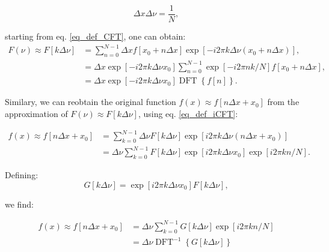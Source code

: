 \begin{equation}
\Delta x \Delta \nu = \frac{1}{N},
\end{equation}


starting from eq. \eqref{eq_def_CFT}, one can obtain:
\begin{equation}\label{eq_approx_CFT}
\begin{aligned}
	F(\nu) \approx F[k\Delta \nu] &= \sum_{n=0}^{N-1} \Delta x f[x_0 +n\Delta x] \operatorname{exp} \left[-i2\pi k \Delta \nu (x_0 +n \Delta x)\right],\\
	&= \Delta x \operatorname{exp}\left[-i 2\pi k \Delta \nu x_0\right] \sum_{n=0}^{N-1} \operatorname{exp}\left[-i2\pi nk/N\right] f[x_0 +n\Delta x], \\
	&= \Delta x \operatorname{exp}\left[-i 2\pi k \Delta \nu x_0\right] \operatorname{DFT}\left\{f[n]\right\}.
\end{aligned}
\end{equation}

Similary, we can reobtain the original function $f(x) \approx f[n\Delta x + x_0]$ from the approximation of $F(\nu) \approx F[k\Delta \nu]$, using eq. \eqref{eq_def_iCFT}:

\begin{equation}
	\begin{aligned}
	f(x) \approx f[n\Delta x+ x_0] &= \sum_{k=0}^{N-1} \Delta \nu F[k\Delta \nu] \operatorname{exp}\left[i2\pi k\Delta \nu (n\Delta x + x_0)\right]\\
	&= \Delta\nu \sum_{k=0}^{N-1}F[k\Delta\nu]\operatorname{exp}\left[i2\pi k\Delta \nu x_0\right]\operatorname{exp}\left[i2\pi kn/N\right].
	\end{aligned}
\end{equation}

Defining:
\begin{equation}
G[k\Delta\nu]  = \operatorname{exp}\left[i2\pi k \Delta\nu x_0\right] F[k\Delta\nu],
\end{equation}

we find:

\begin{equation}
	\begin{aligned}
	f(x) \approx f[n\Delta x+ x_0] &=  \Delta\nu \sum_{k=0}^{N-1}G[k\Delta\nu]\operatorname{exp}\left[i2\pi kn/N\right]\\
	&= \Delta\nu \operatorname{DFT}^{-1}\left\{G[k\Delta\nu]\right\}
	\end{aligned}
\end{equation}



